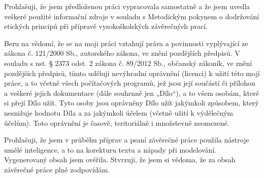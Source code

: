 \documentclass[czech,bachelor,unicode,oneside]{ctufit-thesis}
\begin{document}
\begin{declarationpage}
  Prohlašuji, že jsem předloženou práci vypracovala samostatně a že jsem uvedla veškeré použité
  informační zdroje v souladu s Metodickým pokynem o dodržování etických principů při přípravě
  vysokoškolských závěrečných prací.

  Beru na vědomí, že se na moji práci vztahují práva a povinnosti vyplývající ze zákona č. 121/2000 Sb.,
  autorského zákona, ve znění pozdějších předpisů. V souladu s ust. § 2373 odst. 2 zákona č. 89/2012
  Sb., občanský zákoník, ve znění pozdějších předpisů, tímto uděluji nevýhradní oprávnění (licenci) k
  užití této mojí práce, a to včetně všech počítačových programů, jež jsou její součástí či přílohou a
  veškeré jejich dokumentace (dále souhrnně jen „Dílo“), a to všem osobám, které si přejí Dílo užít. Tyto
  osoby jsou oprávněny Dílo užít jakýmkoli způsobem, který nesnižuje hodnotu Díla a za jakýmkoli
  účelem (včetně užití k výdělečným účelům). Toto oprávnění je časově, teritoriálně i množstevně
  neomezené.

  Prohlašuji, že jsem v průběhu příprav a psaní závěrečné práce použila nástroje umělé
  inteligence, a to na korekturu textu a nápady při modelování. Vygenerovaný obsah jsem ověřila. Stvrzuji, že jsem si vědoma, že za obsah
  závěrečné práce plně zodpovídám.

  {
  }
\end{declarationpage}
\end{document}
